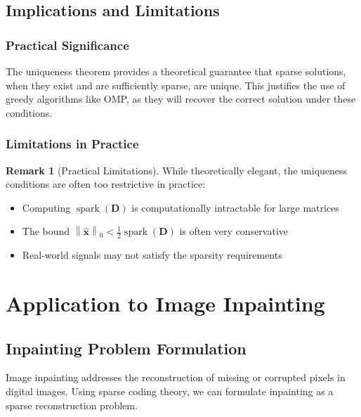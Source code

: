 \documentclass[12pt]{article}
\renewcommand{\vec}[1]{\mathbf{#1}}
\DeclareMathOperator{\spark}{spark}
\newcommand{\zeronorm}[1]{\left\|#1\right\|_0}
\theoremstyle{definition}
\newtheorem{remark}[theorem]{Remark}
\begin{document}
\subsection{Implications and Limitations}

\subsubsection{Practical Significance}

\begin{important}
    The uniqueness theorem provides a theoretical guarantee that sparse solutions, when they exist and are sufficiently sparse, are unique. This justifies the use of greedy algorithms like OMP, as they will recover the correct solution under these conditions.
\end{important}

\subsubsection{Limitations in Practice}

\begin{remark}[Practical Limitations]
    While theoretically elegant, the uniqueness conditions are often too restrictive in practice:
    \begin{itemize}
        \item Computing $\spark(\mathbf{D})$ is computationally intractable for large matrices
        \item The bound $\zeronorm{\hat{\vec{x}}} < \frac{1}{2}\spark(\mathbf{D})$ is often very conservative
        \item Real-world signals may not satisfy the sparsity requirements
    \end{itemize}
\end{remark}

\newpage

\section{Application to Image Inpainting}

\subsection{Inpainting Problem Formulation}

Image inpainting addresses the reconstruction of missing or corrupted pixels in digital images. Using sparse coding theory, we can formulate inpainting as a sparse reconstruction problem.
\end{document}
